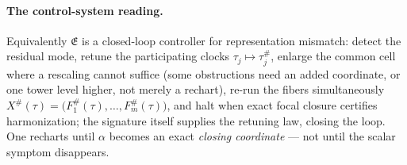 \documentclass[11pt]{article}
\theoremstyle{definition}
\begin{document}
\paragraph{The control-system reading.} Equivalently $\mathfrak E$ is a closed-loop controller for representation
mismatch: detect the residual mode, retune the participating clocks $\tau_j\mapsto\tau_j^\#$, enlarge the common
cell where a rescaling cannot suffice (some obstructions need an added coordinate, or one tower level higher, not
merely a rechart), re-run the fibers simultaneously $X^\#(\tau)=\big(F_1^\#(\tau),\dots,F_m^\#(\tau)\big)$, and
halt when exact focal closure certifies harmonization; the signature itself supplies the retuning law, closing the
loop. One recharts until $\alpha$ becomes an exact \emph{closing coordinate} --- not until the scalar symptom
disappears.


\end{document}
